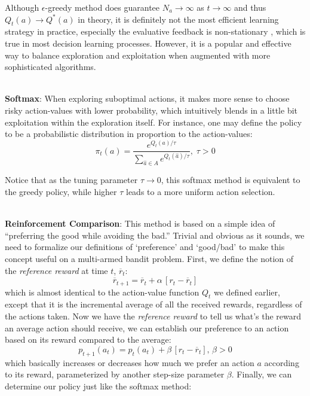 \documentclass[conference]{IEEEtran}
\begin{document}
Although $\epsilon$-greedy method does guarantee $N_a \rightarrow \infty$ as $t \rightarrow \infty$ and thus $Q_t(a) \rightarrow Q^*(a)$ in theory, it is definitely not the most efficient learning strategy in practice, especially the evaluative feedback is non-stationary , which is true in most decision learning processes. However, it is a popular and effective way to balance exploration and exploitation when augmented with more sophisticated algorithms.

\-\\
\textbf{Softmax}: When exploring suboptimal actions, it makes more sense to choose risky action-values with lower probability, which intuitively blends in a little bit exploitation within the exploration itself. For instance, one may define the policy to be a probabilistic distribution in proportion to the action-values:
\begin{equation*}
	\pi_t(a) = \frac{e^{Q_t(a)/\tau}}{\sum_{\hat{a} \in A}e^{Q_t(\hat{a})/\tau}},\; \tau > 0
\end{equation*}

Notice that as the tuning parameter $\tau \rightarrow 0$, this softmax method is equivalent to the greedy policy, while higher $\tau$ leads to a more uniform action selection.


\-\\
\textbf{Reinforcement Comparison}: This method is based on a simple idea of ``preferring the good while avoiding the bad.'' Trivial and obvious as it sounds, we need to formalize our definitions of `preference' and `good/bad' to make this concept useful on a multi-armed bandit problem. First, we define the notion of the \emph{reference reward} at time $t$, $\overline{r}_t$:
\begin{equation*}
	\overline{r}_{t+1} = \overline{r}_t + \alpha\,[r_t - \overline{r}_t]
\end{equation*}
\noindent which is almost identical to the action-value function $Q_t$ we defined earlier, except that it is the incremental average of all the received rewards, regardless of the actions taken. Now we have the \emph{reference reward} to tell us what's the reward an average action should receive, we can establish our preference to an action based on its reward compared to the average:
\begin{equation*}
	p_{t+1}(a_t) = p_t(a_t) + \beta\,[r_t - \overline{r}_t],\, \beta > 0
\end{equation*}
\noindent which basically increases or decreases how much we prefer an action $a$ according to its reward, parameterized by another step-size parameter $\beta$. Finally, we can determine our policy just like the softmax method:
\end{document}
